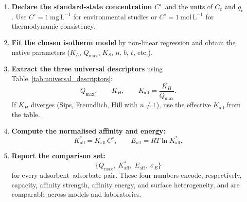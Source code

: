 \documentclass[12pt]{article}
\begin{document}
	\begin{enumerate}
		\item \textbf{Declare the standard-state concentration
		$C^\circ$}~and the units of $C_e$ and $q_e$.
		Use $C^\circ = 1~\mathrm{mg\,L^{-1}}$ for environmental
		studies or $C^\circ = 1~\mathrm{mol\,L^{-1}}$ for
		thermodynamic consistency.

		\item \textbf{Fit the chosen isotherm model} by non-linear
		regression and obtain the native parameters
		($K_L$, $Q_{\max}$, $K_S$, $n$, $b$, $t$, etc.).

		\item \textbf{Extract the three universal descriptors}
		using Table~\ref{tab:universal_descriptors}:
		\begin{equation}
			Q_{\max},
			\qquad
			K_H,
			\qquad
			K_{\mathrm{aff}} = \frac{K_H}{Q_{\max}}.
			\label{eq:protocol_extract}
		\end{equation}
		If $K_H$ diverges (Sips, Freundlich, Hill with $n \neq 1$),
		use the effective $K_{\mathrm{aff}}$ from the table.

		\item \textbf{Compute the normalised affinity and energy:}
		\begin{equation}
			K_{\mathrm{aff}}^{\ast}
			= K_{\mathrm{aff}}\, C^\circ,
			\qquad
			E_{\mathrm{aff}} = RT\ln K_{\mathrm{aff}}^{\ast}.
		\end{equation}

		\item \textbf{Report the comparison set:}
		\begin{equation}
			\bigl\{
			Q_{\max},\;
			K_{\mathrm{aff}}^{\ast},\;
			E_{\mathrm{aff}},\;
			\sigma_E
			\bigr\}
			\label{eq:comparison_set}
		\end{equation}
		for every adsorbent--adsorbate pair.  These four numbers
		encode, respectively, capacity, affinity strength, affinity
		energy, and surface heterogeneity, and are comparable across
		models and laboratories.
	\end{enumerate}
\end{document}
